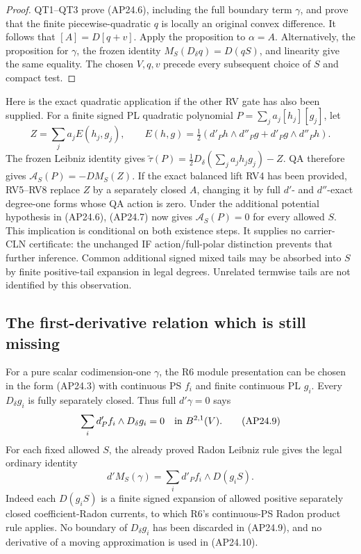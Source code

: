 \begin{proof}
QT1--QT3 prove (AP24.6), including the full boundary term
\(\gamma\), and prove that the finite piecewise-quadratic
\(q\) is locally an original convex difference.  It follows that
\([A]=D[q+v]\).  Apply the proposition to \(\alpha=A\).
Alternatively, the proposition for \(\gamma\), the frozen
identity \(M_S(D_\delta q)=D(qS)\), and linearity give the
same equality.  The chosen \(V,q,v\) precede every subsequent
choice of \(S\) and compact test.
\end{proof}

Here is the exact quadratic application if the other RV gate has
also been supplied.  For a finite signed PL quadratic polynomial
\(P=\sum_j a_j[h_j][g_j]\), let
\[
 Z=\sum_j a_j E(h_j,g_j),\qquad
 E(h,g)=\tfrac12(d'_Ph\wedge d''_Pg+d'_Pg\wedge d''_Ph).
                                                               \tag{AP24.8}
\]
The frozen Leibniz identity gives
\(
 \widetilde\tau(P)=\tfrac12D_\delta(\sum_j a_jh_jg_j)-Z
\).
QA therefore gives
\(
 \mathcal A_S(P)=-D M_S(Z)
\).
If the exact balanced lift RV4 has been provided, RV5--RV8 replace
\(Z\) by a separately closed \(A\), changing it by full
\(d'\)- and \(d''\)-exact degree-one forms whose QA action is
zero.  Under the additional potential hypothesis in (AP24.6),
(AP24.7) now gives \(\mathcal A_S(P)=0\) for every allowed
\(S\).  This implication is conditional on both existence steps.
It supplies no carrier-CLN certificate: the unchanged IF
action/full-polar distinction prevents that further inference.
Common additional signed mixed tails may be absorbed into \(S\)
by finite positive-tail expansion in legal degrees.  Unrelated
termwise tails are not identified by this observation.

\subsection{The first-derivative relation which is still missing}

For a pure scalar codimension-one \(\gamma\), the R6 module
presentation can be chosen in the form (AP24.3) with continuous
PS \(f_i\) and finite continuous PL \(g_i\).  Every
\(D_\delta g_i\) is fully separately closed.  Thus full
\(d'\gamma=0\) says
\[
               \sum_i d'_Pf_i\wedge D_\delta g_i=0
                         \quad\hbox{in }B^{2,1}(V).        \tag{AP24.9}
\]
For each fixed allowed \(S\), the already proved Radon Leibniz
rule gives the legal ordinary identity
\[
               d'M_S(\gamma)
                    =\sum_i d'_Pf_i\wedge D(g_iS).         \tag{AP24.10}
\]
Indeed each \(D(g_iS)\) is a finite signed expansion of allowed
positive separately closed coefficient-Radon currents, to which
R6's continuous-PS Radon product rule applies.  No boundary of
\(D_\delta g_i\) has been discarded in (AP24.9), and no
derivative of a moving approximation is used in (AP24.10).

